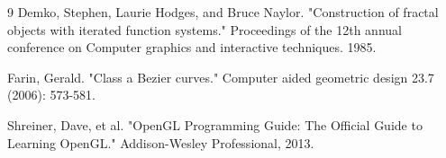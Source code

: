 \documentclass[12pt,a4paper]{report}
\begin{document}
\begin{thebibliography}{9}
Demko, Stephen, Laurie Hodges, and Bruce Naylor. "Construction of fractal objects with iterated function systems." Proceedings of the 12th annual conference on Computer graphics and interactive techniques. 1985.

Farin, Gerald. "Class a Bezier curves." Computer aided geometric design 23.7 (2006): 573-581.

Shreiner, Dave, et al. "OpenGL Programming Guide: The Official Guide to Learning OpenGL." Addison-Wesley Professional, 2013.
\end{thebibliography}
\end{document}
